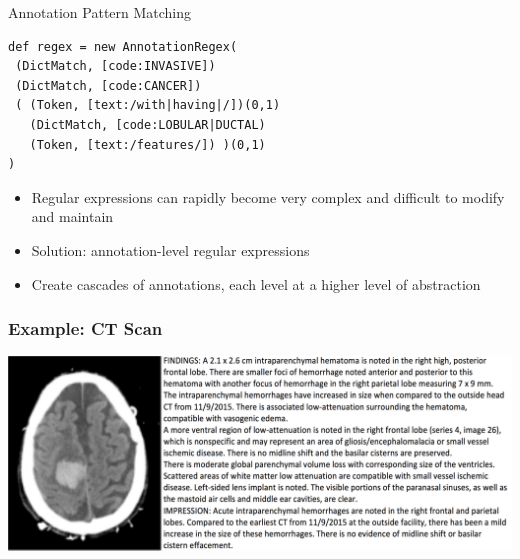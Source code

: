 \documentclass[10pt]{beamer}
\begin{document}
\begin{frame}[fragile]{Annotation Pattern Matching}

\begin{lstlisting}[frame=single]
def regex = new AnnotationRegex(
 (DictMatch, [code:INVASIVE])
 (DictMatch, [code:CANCER])
 ( (Token, [text:/with|having|/])(0,1)
   (DictMatch, [code:LOBULAR|DUCTAL)
   (Token, [text:/features/]) )(0,1)
)
\end{lstlisting}

\begin{itemize}
	\item Regular expressions can rapidly become very complex and difficult to modify and maintain
	\item Solution: \alert{annotation-level regular expressions}
	\item Create cascades of annotations, each level at a higher level of abstraction
\end{itemize}

\end{frame}

\begin{frame}
\frametitle{Example: CT Scan}

\begin{center}
	\includegraphics[scale=0.2]{figures/ct-scan-image-and-note.png}
\end{center}


\end{frame}
\end{document}
